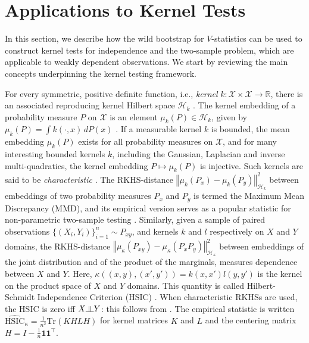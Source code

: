 \section{Applications to Kernel Tests}\label{sec:mmd_hsic}
In this section, we describe how the wild bootstrap for $V$-statistics can be used to construct kernel tests for independence and the two-sample problem, which are applicable to weakly dependent observations. We start by reviewing the main concepts underpinning the kernel testing framework.

For every symmetric, positive definite function, i.e., \emph{kernel} $k:\mathcal{X}\times\mathcal{X}\to\mathbb{R}$,
there is an associated reproducing kernel Hilbert space $\mathcal{H}_{k}$ \cite[p. 19]{BerTho04}.  The kernel embedding of a probability measure
$P$ on $\mathcal{X}$ is an element $\mu_{k}(P)\in\mathcal{H}_{k}$,
given by $\mu_{k}(P)=\int k(\cdot,x)\, dP(x)$ \cite{BerTho04,SmoGreSonSch07}.
If a measurable kernel $k$ is bounded, the mean embedding $\mu_{k}(P)$
exists for all probability measures on $\mathcal{X}$, and for many interesting
bounded kernels $k$, including the Gaussian, Laplacian and inverse
multi-quadratics, the kernel embedding $P\mapsto\mu_{k}(P)$ is injective.
Such kernels are said to be \emph{characteristic} \cite{SriGreFukLanetal10}.
The RKHS-distance $\left\Vert \mu_k(P_x)-\mu_k(P_y)\right\Vert_{{\mathcal H}_k}^2$ between embeddings of two probability measures $P_x$ and $P_y$
is termed the Maximum Mean Discrepancy (MMD), and its empirical version serves as a popular statistic for non-parametric two-sample testing \cite{gretton2012kernel}.
Similarly, given a sample of paired observations $\{(X_i,Y_i)\}_{i=1}^n\sim P_{xy}$, and kernels $k$ and $l$ respectively on $X$ and $Y$ domains, the RKHS-distance 
$\left\Vert \mu_\kappa(P_{xy})-\mu_\kappa(P_x P_y)\right\Vert_{{\mathcal H}_{\kappa}}^2$ between embeddings of the joint distribution and of the product of the marginals, measures dependence between $X$ and $Y$. Here, $\kappa((x,y),(x',y'))=k(x,x')l(y,y')$ is the kernel on the product space of $X$ and $Y$ domains.
This quantity is called Hilbert-Schmidt Independence Criterion (HSIC) \cite{gretton_measuring_2005,gretton_kernel_2008}. When characteristic RKHSs are used, the HSIC is zero iff $X \indep Y$: this follows from \cite{Asimplercondition}.
The  empirical statistic is written $\widehat{\text{HSIC}}_{\kappa} = \frac{1}{n^2}\text{Tr}(KHLH)$ for kernel matrices $K$ and $L$ and the centering matrix $H=I-\frac{1}{n}\mathbf{1}\mathbf{1}^\top$.


